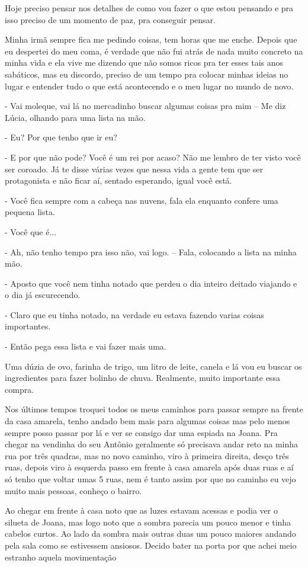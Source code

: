 Hoje preciso pensar nos detalhes de como vou fazer o que estou pensando e pra isso preciso de um momento de paz, pra conseguir pensar.

Minha irmã sempre fica me pedindo coisas, tem horas que me enche. Depois que eu despertei do meu coma, é verdade que não fui atrás de nada muito concreto na minha vida e ela vive me dizendo que não somos ricos pra ter esses tais anos sabáticos, mas eu discordo, preciso de um tempo pra colocar minhas ideias no lugar e entender tudo o que está acontecendo e o meu lugar no mundo de novo.

- Vai moleque, vai lá no mercadinho buscar algumas coisas pra mim -- Me diz Lúcia, olhando para uma lista na mão.

- Eu? Por que tenho que ir eu?

- E por que não pode? Você é um rei por acaso? Não me lembro de ter visto você ser coroado. Já te disse várias vezes que nessa vida a gente tem que ser protagonista e não ficar aí, sentado esperando, igual você está.

- Você fica sempre com a cabeça nas nuvens, fala ela enquanto confere uma pequena lista.

- Você que é...

- Ah, não tenho tempo pra isso não, vai logo. -- Fala, colocando a lista na minha mão.

- Aposto que você nem tinha notado que perdeu o dia inteiro deitado viajando e o dia já escurecendo.

- Claro que eu tinha notado, na verdade eu estava fazendo varias coisas importantes.

- Então pega essa lista e vai fazer mais uma.

Uma dúzia de ovo, farinha de trigo, um litro de leite, canela e lá vou eu buscar os ingredientes para fazer bolinho de chuva. Realmente, muito importante essa compra.

Nos últimos tempos troquei todos os meus caminhos para passar sempre na frente da casa amarela, tenho andado bem mais para algumas coisas mas pelo menos sempre posso passar por lá e ver se consigo dar uma espiada na Joana. Pra chegar na vendinha do seu Antônio geralmente só precisava andar reto na minha rua por três quadras, mas no novo caminho, viro à primeira direita, desço três ruas, depois viro à esquerda passo em frente à casa amarela após duas ruas e aí só tenho que voltar umas 5 ruas, nem é tanto assim por que no caminho eu vejo muito mais pessoas, conheço o bairro. 

Ao chegar em frente à casa noto que as luzes estavam acessas e podia ver o silueta de Joana, mas logo noto que a sombra parecia um pouco menor e tinha cabelos curtos. Ao lado da sombra mais outras duas um pouco maiores andando pela sala como se estivessem ansiosos. Decido bater na porta por que achei meio estranho aquela movimentação

